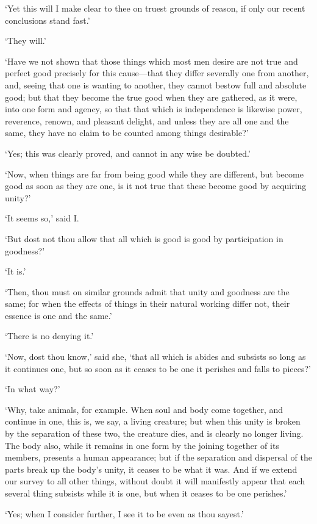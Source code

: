 \documentclass[11pt]{book}
\begin{document}
`Yet this will I make clear to thee on truest grounds of reason, if only
our recent conclusions stand fast.'

`They will.'

`Have we not shown that those things which most men desire are not true
and perfect good precisely for this cause---that they differ severally
one from another, and, seeing that one is wanting to another, they
cannot bestow full and absolute good; but that they become the true good
when they are gathered, as it were, into one form and agency, so that
that which is independence is likewise power, reverence, renown, and
pleasant delight, and unless they are all one and the same, they have no
claim to be counted among things desirable?'

`Yes; this was clearly proved, and cannot in any wise be doubted.'

`Now, when things are far from being good while they are different, but
become good as soon as they are one, is it not true that these become
good by acquiring unity?'

`It seems so,' said I.

`But dost not thou allow that all which is good is good by participation
in goodness?'

`It is.'

`Then, thou must on similar grounds admit that unity and goodness are
the same; for when the effects of things in their natural working differ
not, their essence is one and the same.'

`There is no denying it.'

`Now, dost thou know,' said she, `that all which is abides and subsists
so long as it continues one, but so soon as it ceases to be one it
perishes and falls to pieces?'

`In what way?'

`Why, take animals, for example. When soul and body come together, and
continue in one, this is, we say, a living creature; but when this unity
is broken by the separation of these two, the creature dies, and is
clearly no longer living. The body also, while it remains in one form by
the joining together of its members, presents a human appearance; but if
the separation and dispersal of the parts break up the body's unity, it
ceases to be what it was. And if we extend our survey to all other
things, without doubt it will manifestly appear that each several thing
subsists while it is one, but when it ceases to be one perishes.'

`Yes; when I consider further, I see it to be even as thou sayest.'
\end{document}
